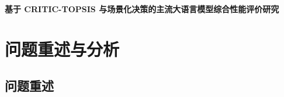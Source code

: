 \documentclass[UTF8,zihao=-4,a4paper,fontset=none]{ctexart}
\begin{document}
\pagestyle{frontmatter}

\begin{center}
  {\teamHei{}\textbf{基于 CRITIC-TOPSIS 与场景化决策的主流大语言模型综合性能评价研究}}\\[1.2em]
\end{center}

\begin{abstract}
本文面向公开资料条件下的大语言模型综合评价问题，建立“数据冻结--可比性清洗--指标筛选--客观赋权--场景评价--成本效益--稳健性检验”的完整流程。评价体系采用能力、工程效率、经济成本与能耗边界的分层结构。以 2026 年 8 月 17 日为数据截止日期，从 9 个初始候选模型中确定 6 个最终研究对象，并从高难推理、长文本、代码、专业任务、多模态与文档理解等维度冻结 9 个核心指标。原始缺失值保持为 NA，不进行估算、插值或零值填充。

问题一采用相关性分析、CRITIC 客观赋权与 TOPSIS 综合评价。Claude Fable 5、Kimi K3、GPT-5.6 Sol 分列通用能力综合排名前三；GLM-5.2 因仅有 4/9 项核心成绩而不进入主排名。问题二按照“50\% CRITIC 权重 + 50\% 题意驱动场景偏好”构造三类基准场景权重；在该等比例基准下，Kimi K3 在科研长文本场景升至第一，Claude Fable 5 在日常对话与代码开发场景排名第一。问题三以 100 万输入 token 与 20 万输出 token 为标准工作负载，得到 Kimi K3 与 Claude Fable 5 构成的性能--成本 Pareto 前沿；严格部署效率比较仅覆盖配置兼容的 4 个模型。

熵权法对照与 36 个单因素权重扰动均保持前三名次序，最低 Kendall 秩相关系数为 0.8。成本--性能回归仅基于 5 个可排名模型，故只解释为当前样本内的探索性关系。本文完整保留模型版本、评测设置、数据来源与时间截面，为不同场景和预算条件下的模型选型提供可复核依据。

\vspace{0.8em}
\noindent\textbf{关键词：}大语言模型；CRITIC；TOPSIS；场景评价；Pareto 前沿；敏感性分析
\end{abstract}

\clearpage
\begingroup
\small
\linespread{1.0}\selectfont
\setlength{\parskip}{0pt}
\tableofcontents
\endgroup
\thispagestyle{frontmatter}
\clearpage
\pagestyle{mainmatter}

\section{问题重述与分析}

\subsection{问题重述}
\end{document}
